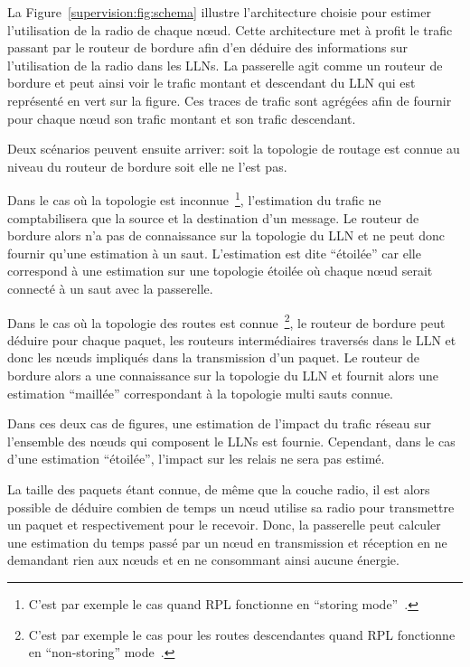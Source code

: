 La Figure~\ref{supervision:fig:schema} illustre l'architecture choisie pour estimer l'utilisation de la radio de chaque nœud.
Cette architecture met à profit le trafic passant par le routeur de bordure afin d'en déduire des informations sur l'utilisation de la radio dans les \ac{LLN}s.
La passerelle agit comme un routeur de bordure et peut ainsi voir le trafic montant et descendant du \ac{LLN} qui est représenté en vert sur la figure.
Ces traces de trafic sont agrégées afin de fournir pour chaque nœud son trafic montant et son trafic descendant.


Deux scénarios peuvent ensuite arriver: soit la topologie de routage est connue au niveau du routeur de bordure soit elle ne l'est pas.

Dans le cas où la topologie est inconnue~\footnote{C'est par exemple le cas quand \ac{RPL} fonctionne en ``storing mode''~\cite{rfc6550}.}, l'estimation du trafic ne comptabilisera que la source et la destination d'un message.
Le routeur de bordure alors n'a pas de connaissance sur la topologie du \ac{LLN} et ne  peut donc fournir qu'une estimation à un saut.
L'estimation est dite ``étoilée'' car elle correspond à une estimation sur une topologie étoilée où chaque nœud serait connecté à un saut avec la passerelle.

Dans le cas où la topologie des routes est connue~\footnote{C'est par exemple le cas pour les routes descendantes quand \ac{RPL} fonctionne en ``non-storing'' mode~\cite{rfc6550}.}, le routeur de bordure peut déduire pour chaque paquet, les routeurs intermédiaires traversés dans le \ac{LLN} et donc les nœuds impliqués dans la transmission d'un paquet.
Le routeur de bordure alors a une connaissance sur la topologie du \ac{LLN} et fournit alors une estimation ``maillée'' correspondant à la topologie multi sauts connue.

Dans ces deux cas de figures, une estimation de l'impact du trafic réseau sur l'ensemble des nœuds qui composent le \ac{LLN}s est fournie.
Cependant, dans le cas d'une estimation ``étoilée'', l'impact sur les relais ne sera pas estimé.


La taille des paquets étant connue, de même que la couche radio, il est alors possible de déduire combien de temps un nœud utilise sa radio pour transmettre un paquet et respectivement pour le recevoir.
Donc, la passerelle peut calculer une estimation du temps passé par un nœud en transmission et réception en ne demandant rien aux nœuds et en ne consommant ainsi aucune énergie.

